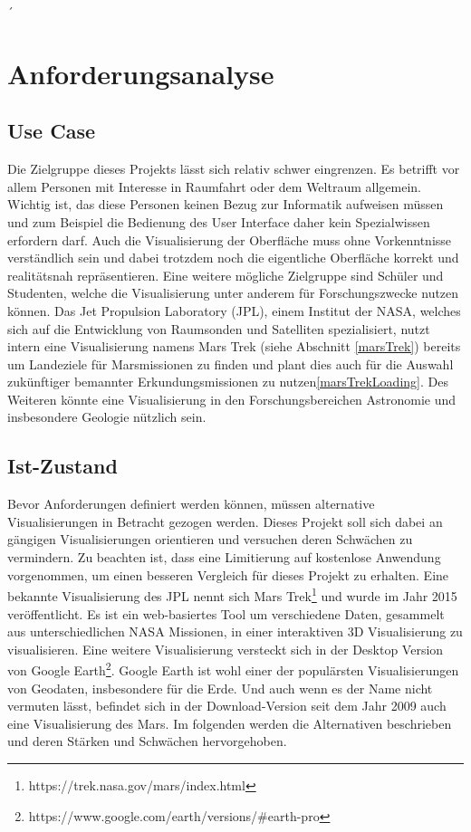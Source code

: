 ´\chapter{Anforderungsanalyse}

\section{Use Case}
Die Zielgruppe dieses Projekts lässt sich relativ schwer eingrenzen. Es betrifft vor allem Personen mit Interesse in Raumfahrt oder dem Weltraum allgemein. Wichtig ist, das diese Personen keinen Bezug zur Informatik aufweisen müssen und zum Beispiel die Bedienung des User Interface daher kein Spezialwissen erfordern darf. Auch die Visualisierung der Oberfläche muss ohne Vorkenntnisse verständlich sein und dabei trotzdem noch die eigentliche Oberfläche korrekt und realitätsnah repräsentieren. Eine weitere mögliche Zielgruppe sind Schüler und Studenten, welche die Visualisierung unter anderem für Forschungszwecke nutzen können. Das Jet Propulsion Laboratory (JPL), einem Institut der NASA, welches sich auf die Entwicklung von Raumsonden und Satelliten spezialisiert, nutzt intern eine Visualisierung namens Mars Trek (siehe Abschnitt \ref{marsTrek}) bereits um Landeziele für Marsmissionen zu finden und plant dies auch für die Auswahl zukünftiger bemannter Erkundungsmissionen zu nutzen\ref{marsTrekLoading}. Des Weiteren könnte eine Visualisierung in den Forschungsbereichen Astronomie und insbesondere Geologie nützlich sein.

\section{Ist-Zustand}\label{istZustand}
Bevor Anforderungen definiert werden können, müssen alternative Visualisierungen in Betracht gezogen werden. Dieses Projekt soll sich dabei an gängigen Visualisierungen orientieren und versuchen deren Schwächen zu vermindern. Zu beachten ist, dass eine Limitierung auf kostenlose Anwendung vorgenommen, um einen besseren Vergleich für dieses Projekt zu erhalten. Eine bekannte Visualisierung des JPL nennt sich Mars Trek\footnote{https://trek.nasa.gov/mars/index.html} und wurde im Jahr 2015 veröffentlicht. Es ist ein web-basiertes Tool um verschiedene Daten, gesammelt aus unterschiedlichen NASA Missionen, in einer interaktiven 3D Visualisierung zu visualisieren. Eine weitere Visualisierung versteckt sich in der Desktop Version von Google Earth\footnote{https://www.google.com/earth/versions/\#earth-pro}. Google Earth ist wohl einer der populärsten Visualisierungen von Geodaten, insbesondere für die Erde. Und auch wenn es der Name nicht vermuten lässt, befindet sich in der Download-Version seit dem Jahr 2009 auch eine Visualisierung des Mars. Im folgenden werden die Alternativen beschrieben und deren Stärken und Schwächen hervorgehoben.

